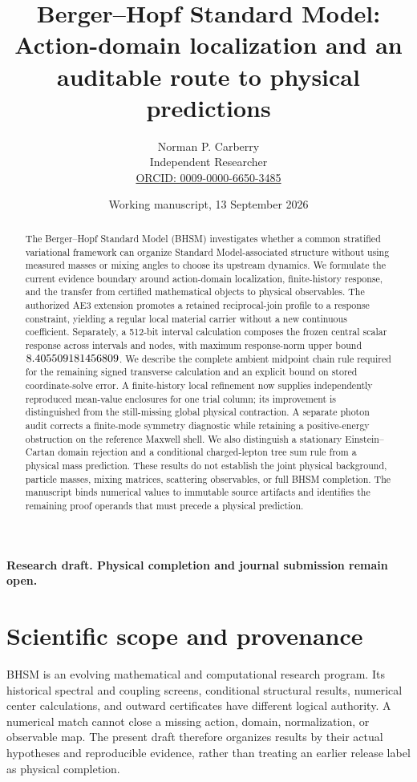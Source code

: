 \documentclass[11pt]{article}
\title{Berger--Hopf Standard Model:\\Action-domain localization and an auditable route to physical predictions}
\author{Norman P. Carberry\\Independent Researcher\\
\href{https://orcid.org/0009-0000-6650-3485}{ORCID: 0009-0000-6650-3485}}
\date{Working manuscript, 13 September 2026}
\begin{document}
\maketitle
\begin{center}
\small\textbf{Research draft. Physical completion and journal submission remain open.}
\end{center}

\begin{abstract}
The Berger--Hopf Standard Model (BHSM) investigates whether a common
stratified variational framework can organize Standard Model-associated
structure without using measured masses or mixing angles to choose its
upstream dynamics. We formulate the current evidence boundary around
action-domain localization, finite-history response, and the transfer from
certified mathematical objects to physical observables. The authorized AE3
extension promotes a retained reciprocal-join profile to a response
constraint, yielding a regular local material carrier without a new
continuous coefficient. Separately, a 512-bit interval calculation composes
the frozen central scalar response across \ScalarIntervals{} intervals and
\ScalarNodes{} nodes, with maximum response-norm upper bound
\(8.405509181456809\). We describe the complete ambient midpoint chain rule
required for the remaining signed transverse calculation and an explicit
bound on stored coordinate-solve error. A finite-history local refinement
now supplies independently reproduced
mean-value enclosures for one trial column; its improvement is distinguished
from the still-missing global physical contraction. A separate photon audit corrects a
finite-mode symmetry diagnostic while retaining a positive-energy obstruction
on the reference Maxwell shell. We also distinguish a stationary
Einstein--Cartan domain rejection and a conditional charged-lepton tree
sum rule from a physical mass prediction. These results do not establish the
joint physical background, particle masses, mixing matrices, scattering
observables, or full BHSM completion. The manuscript binds numerical values
to immutable source artifacts and identifies the remaining proof operands
that must precede a physical prediction.
\end{abstract}

\section{Scientific scope and provenance}
BHSM is an evolving mathematical and computational research program.
Its historical spectral and coupling screens, conditional structural
results, numerical center calculations, and outward certificates have
different logical authority. A numerical match cannot close a missing
action, domain, normalization, or observable map. The present draft therefore
organizes results by their actual hypotheses and reproducible evidence,
rather than treating an earlier release label as physical completion.
\end{document}
